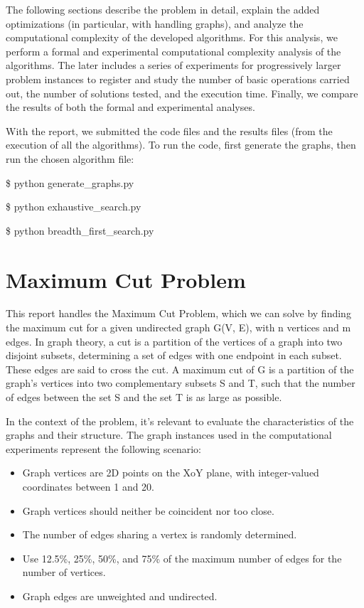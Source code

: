 \documentclass[]{revdetua}
\begin{document}
The following sections describe the problem in detail, explain the added optimizations (in particular, with handling graphs), and analyze the computational complexity of the developed algorithms. For this analysis, we perform a formal and experimental computational complexity analysis of the algorithms. The later includes a series of experiments for progressively larger problem instances to register and study the number of basic operations carried out, the number of solutions tested, and the execution time. Finally, we compare the results of both the formal and experimental analyses.

With the report, we submitted the code files and the results files (from the execution of all the algorithms). To run the code, first generate the graphs, then run the chosen algorithm file:\linebreak

\$ python generate\_graphs.py 

\$ python exhaustive\_search.py

\$ python breadth\_first\_search.py

\section{Maximum Cut Problem}

This report handles the Maximum Cut Problem, which we can solve by finding the maximum cut for a given undirected graph G(V, E), with n vertices and m edges. In graph theory, a cut is a partition of the vertices of a graph into two disjoint subsets, determining a set of edges with one endpoint in each subset. These edges are said to cross the cut. A maximum cut of G is a partition of the graph's vertices into two complementary subsets S and T, such that the number of edges between the set S and the set T is as large as possible. 

In the context of the problem, it's relevant to evaluate the characteristics of the graphs and their structure. The graph instances used in the computational experiments represent the following scenario:
\begin{itemize}
\item Graph vertices are 2D points on the XoY plane, with integer-valued coordinates between 1 and 20.
\item Graph vertices should neither be coincident nor too close.
\item The number of edges sharing a vertex is randomly determined.
\item Use 12.5\%, 25\%, 50\%, and 75\% of the maximum number of edges for the number of vertices.
\item Graph edges are unweighted and undirected.
\end{itemize}
\end{document}
